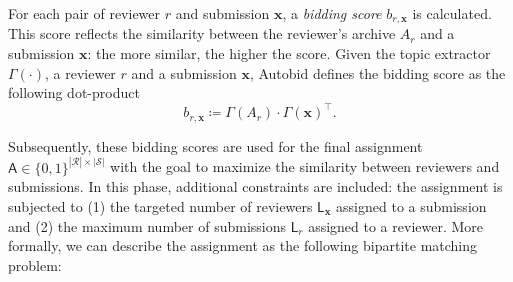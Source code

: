 \documentclass[letterpaper,twocolumn,10pt]{article}
\newcommand{\bow}{\textbf{x}}
\newcommand{\assignment}{\mathsf{A}}
\newcommand{\submission}{\bow}
\newcommand{\submissions}{\mathcal{S}}
\newcommand{\reviewersset}{\mathcal{R}}
\newcommand{\reviewer}{r}
\newcommand{\archive}{A}
\newcommand{\reviewerload}{\mathsf{L}_{\reviewer}}
\newcommand{\paperload}{\mathsf{L}_{\submission}}
\newcommand{\bid}{b}
\newcommand{\topicextractor}{\Gamma}
\begin{document}
For each pair of reviewer $\reviewer$ and submission $\submission$, a \emph{bidding score} $\bid_{\reviewer, \submission}$ is calculated. This score reflects the similarity between the reviewer's archive $\archive_\reviewer$ and a submission $\submission$: the more similar, the higher the score. Given the topic extractor $\topicextractor(\cdot)$, a reviewer $\reviewer$ and a submission $\submission$, Autobid defines the bidding score as the following dot-product
\begin{equation}
\bid_{\reviewer,\submission} \coloneqq \topicextractor(\archive_\reviewer) \cdot \topicextractor(\submission)^\top.
\end{equation}

Subsequently, these bidding scores are used for the final assignment $\assignment \in \{0,1\}^{|\reviewersset|\times|\submissions|}$ with the goal to maximize the similarity between reviewers and submissions.
In this phase, additional constraints are included: the assignment is subjected to (1) the targeted number of reviewers $\paperload$ assigned to a submission and (2) the maximum number of submissions $\reviewerload$ assigned to a reviewer.
More formally, we can describe the assignment as the following bipartite matching problem:
\end{document}

